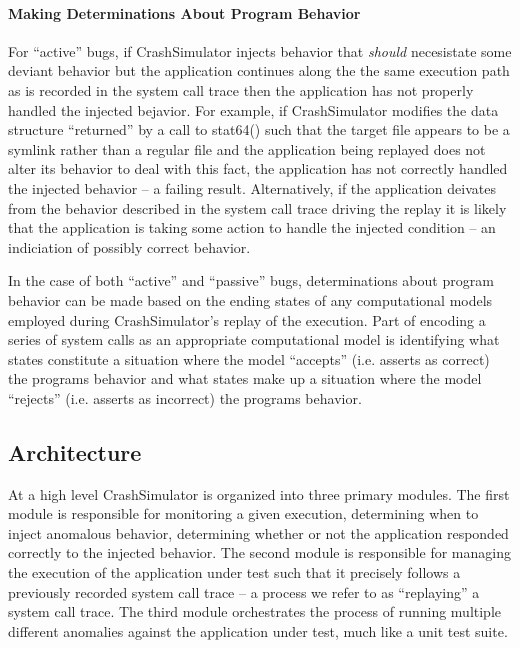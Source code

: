     \paragraph{Making Determinations About Program Behavior}

    For ``active'' bugs, if CrashSimulator injects behavior that \emph{should} necesistate some deviant behavior but the
    application continues along the the same execution path as is recorded in the system call trace then the application
    has not properly handled the injected bejavior.  For example, if CrashSimulator modifies the data structure
    ``returned'' by a call to stat64() such that the target file appears to be a symlink rather than a regular file and
    the application being replayed does not alter its behavior to deal with this fact, the application has not correctly
    handled the injected behavior -- a failing result.  Alternatively, if the application deivates from the behavior
    described in the system call trace driving the replay it is likely that the application is taking some action to
    handle the injected condition -- an indiciation of possibly correct behavior.

    In the case of both ``active'' and ``passive'' bugs, determinations about program behavior can be made based on the
    ending states of any computational models employed during CrashSimulator's replay of the execution.  Part of
    encoding a series of system calls as an appropriate computational model is identifying what states constitute a
    situation where the model ``accepts'' (i.e. asserts as correct) the programs behavior and what states make up a
    situation where the model ``rejects'' (i.e. asserts as incorrect) the programs behavior.

    \subsection{Architecture}
        
    At a high level CrashSimulator is organized into three primary modules. The first module is responsible for
    monitoring a given execution, determining when to inject anomalous behavior, determining whether or not the
    application responded correctly to the injected behavior. The second module is responsible for managing the
    execution of the application under test such that it precisely follows a previously recorded system call trace -- a
    process we refer to as ``replaying'' a system call trace. The third module orchestrates the process of running
    multiple different anomalies against the application under test, much like a unit test suite.
        
